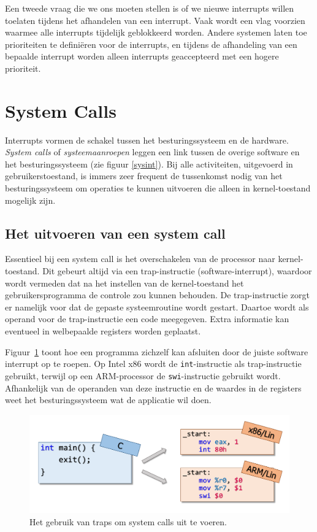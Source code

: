 Een tweede vraag die we ons moeten stellen is of we nieuwe
interrupts willen toelaten tijdens het afhandelen van een interrupt.
Vaak wordt een vlag voorzien waarmee alle interrupts tijdelijk
geblokkeerd worden. Andere systemen laten toe prioriteiten te
defini\"eren voor de interrupts, en tijdens de afhandeling van een
bepaalde interrupt worden alleen interrupts geaccepteerd met een
hogere prioriteit.

\section{System Calls}\label{systemcalls}

Interrupts vormen de schakel tussen het besturingssysteem en de
hardware. \emph{System calls} of
\emph{systeemaanroepen} leggen een link tussen de
overige software en het besturingssysteem (zie figuur \ref{sysint}). Bij alle
activiteiten, uitgevoerd in gebruikerstoestand, is immers zeer frequent de
tussenkomst nodig van het besturingssysteem om operaties te kunnen uitvoeren die
alleen in kernel-toestand mogelijk zijn.

\subsection{Het uitvoeren van een system call}

Essentieel bij een system call is het overschakelen van de
processor naar kernel- toestand. Dit gebeurt altijd via een
trap-instructie (software-interrupt), waardoor wordt vermeden dat na
het instellen van de kernel-toestand het gebruikersprogramma de
controle zou kunnen behouden. De trap-instructie zorgt er namelijk
voor dat de gepaste systeemroutine wordt gestart. Daartoe wordt als
operand voor de trap-instructie een code meegegeven. Extra informatie kan
eventueel in welbepaalde registers worden geplaatst.

Figuur~\ref{fig:systemcalls} toont hoe een programma zichzelf kan afsluiten door
de juiste software interrupt op te roepen. Op Intel x86 wordt de \texttt{int}-instructie
als trap-instructie gebruikt, terwijl op een ARM-processor de \texttt{swi}-instructie
gebruikt wordt. Afhankelijk van de operanden van deze instructie en de waardes in de registers
weet het besturingssysteem wat de applicatie wil doen.

\begin{figure}
  \centering
  \includegraphics[scale=0.4]{images/IntInstructions.pdf}
  \caption{Het gebruik van traps om system calls uit te voeren.}\label{fig:systemcalls}
\end{figure}

